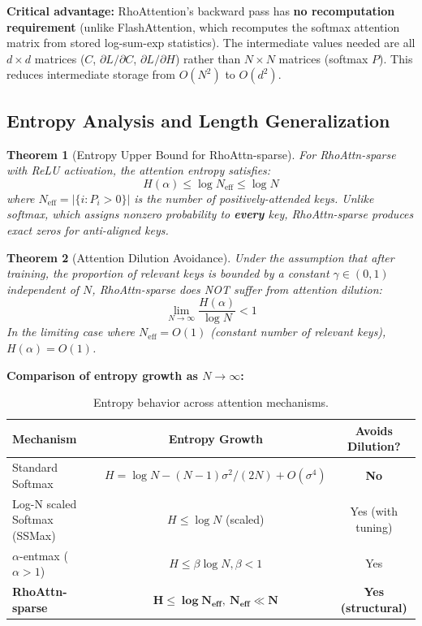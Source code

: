 \documentclass[11pt,a4paper]{article}
\newtheorem{theorem}{Theorem}[section]
\theoremstyle{remark}
\begin{document}
\textbf{Critical advantage:} RhoAttention's backward pass has \textbf{no recomputation requirement} (unlike FlashAttention, which recomputes the softmax attention matrix from stored log-sum-exp statistics). The intermediate values needed are all $d \times d$ matrices ($C$, $\partial L/\partial C$, $\partial L/\partial H$) rather than $N \times N$ matrices (softmax $P$). This reduces intermediate storage from $O(N^2)$ to $O(d^2)$.

\subsection{Entropy Analysis and Length Generalization}

\begin{theorem}[Entropy Upper Bound for RhoAttn-sparse]
\label{thm:entropy}
For RhoAttn-sparse with ReLU activation, the attention entropy satisfies:
\begin{equation}
H(\alpha) \leq \log N_{\text{eff}} \leq \log N
\end{equation}
where $N_{\text{eff}} = |\{i : P_i > 0\}|$ is the number of positively-attended keys. Unlike softmax, which assigns nonzero probability to \textbf{every} key, RhoAttn-sparse produces exact zeros for anti-aligned keys.
\end{theorem}

\begin{theorem}[Attention Dilution Avoidance]
\label{thm:dilution}
Under the assumption that after training, the proportion of relevant keys is bounded by a constant $\gamma \in (0,1)$ independent of $N$, RhoAttn-sparse does NOT suffer from attention dilution:
\begin{equation}
\lim_{N \to \infty} \frac{H(\alpha)}{\log N} < 1
\end{equation}
In the limiting case where $N_{\text{eff}} = O(1)$ (constant number of relevant keys), $H(\alpha) = O(1)$.
\end{theorem}

\textbf{Comparison of entropy growth as $N \to \infty$:}
\begin{table}[h]
\centering
\caption{Entropy behavior across attention mechanisms.}
\begin{tabular}{lcc}
\toprule
\textbf{Mechanism} & \textbf{Entropy Growth} & \textbf{Avoids Dilution?} \\
\midrule
Standard Softmax & $H = \log N - (N-1)\sigma^2/(2N) + O(\sigma^4)$ & \textbf{No} \\
Log-N scaled Softmax (SSMax) & $H \leq \log N$ (scaled) & Yes (with tuning) \\
$\alpha$-entmax ($\alpha > 1$) & $H \leq \beta \log N, \beta < 1$ & Yes \\
\textbf{RhoAttn-sparse} & $\mathbf{H \leq \log N_{\text{eff}},\ N_{\text{eff}} \ll N}$ & \textbf{Yes (structural)} \\
\bottomrule
\end{tabular}
\end{table}
\end{document}
